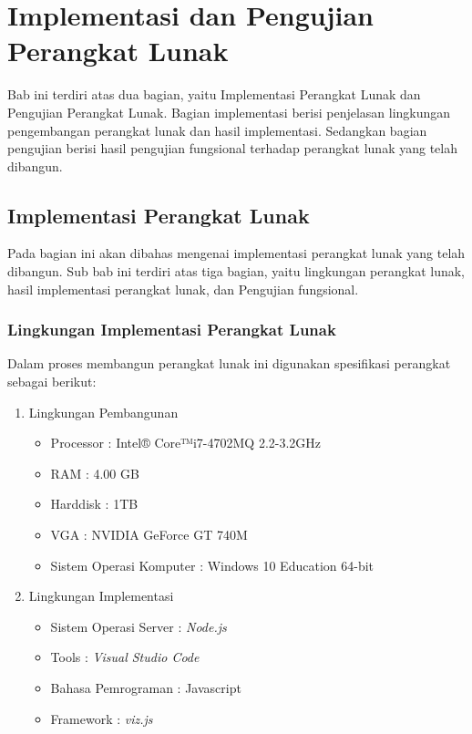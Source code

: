\chapter{Implementasi dan Pengujian Perangkat Lunak}
\label{chap: Implementasi dan Pengujian Perangkat Lunak}

Bab ini terdiri atas dua bagian, yaitu Implementasi Perangkat Lunak dan Pengujian Perangkat Lunak. Bagian implementasi berisi penjelasan lingkungan pengembangan perangkat lunak dan hasil implementasi. Sedangkan bagian pengujian berisi hasil pengujian fungsional terhadap perangkat lunak yang telah dibangun.

\section{Implementasi Perangkat Lunak}
\label{sec: Implementasi Perangkat Lunak}

Pada bagian ini akan dibahas mengenai implementasi perangkat lunak yang telah dibangun. Sub bab ini terdiri atas tiga bagian, yaitu lingkungan perangkat lunak, hasil implementasi perangkat lunak, dan Pengujian fungsional.

\subsection{Lingkungan Implementasi Perangkat Lunak}
\label{sec: Lingkungan Implementasi Perangkat Lunak}

Dalam proses membangun perangkat lunak ini digunakan spesifikasi perangkat sebagai berikut:

\begin{enumerate}
\item Lingkungan Pembangunan \\
\begin{itemize}
\item Processor : Intel® Core™i7-4702MQ 2.2-3.2GHz
\item RAM : 4.00 GB
\item Harddisk : 1TB
\item VGA : NVIDIA GeForce GT 740M
\item Sistem Operasi Komputer : Windows 10 Education 64-bit
\end{itemize}

\item Lingkungan Implementasi
\begin{itemize}
\item Sistem Operasi Server : \textit{Node.js}
\item Tools : \textit{Visual Studio Code}
\item Bahasa Pemrograman : Javascript
\item Framework : \textit{viz.js}
\end{itemize}

\end{enumerate}

